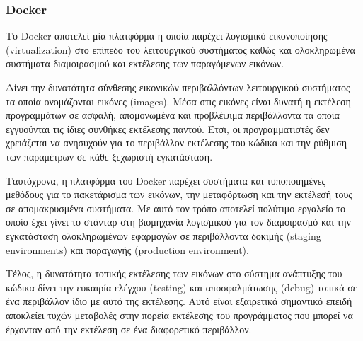 \subsubsection{Docker} \label{subsection:4-2-1-2-docker}


Το Docker αποτελεί μία πλατφόρμα η οποία παρέχει λογισμικό εικονοποίησης (virtualization) στο επίπεδο του λειτουργικού συστήματος καθώς και ολοκληρωμένα συστήματα διαμοιρασμού και εκτέλεσης των παραγόμενων εικόνων.

Δίνει την δυνατότητα σύνθεσης εικονικών περιβαλλόντων λειτουργικού συστήματος τα οποία ονομάζονται εικόνες (images). Μέσα στις εικόνες είναι δυνατή η εκτέλεση προγραμμάτων σε ασφαλή, απομονωμένα και προβλέψιμα περιβάλλοντα τα οποία εγγυούνται τις ίδιες συνθήκες εκτέλεσης παντού. Έτσι, οι προγραμματιστές δεν χρειάζεται να ανησυχούν για το περιβάλλον εκτέλεσης του κώδικα και την ρύθμιση των παραμέτρων σε κάθε ξεχωριστή εγκατάσταση.

Ταυτόχρονα, η πλατφόρμα του Docker παρέχει συστήματα και τυποποιημένες μεθόδους για το πακετάρισμα των εικόνων, την μεταφόρτωση και την εκτέλεσή τους σε απομακρυσμένα συστήματα. Με αυτό τον τρόπο αποτελεί πολύτιμο εργαλείο το οποίο έχει γίνει το στάνταρ στη βιομηχανία λογισμικού για τον διαμοιρασμό και την εγκατάσταση ολοκληρωμένων εφαρμογών σε περιβάλλοντα δοκιμής (staging environments) και παραγωγής (production environment).

Τέλος, η δυνατότητα τοπικής εκτέλεσης των εικόνων στο σύστημα ανάπτυξης του κώδικα δίνει την ευκαιρία ελέγχου (testing) και αποσφαλμάτωσης (debug) τοπικά σε ένα περιβάλλον ίδιο με αυτό της εκτέλεσης. Αυτό είναι εξαιρετικά σημαντικό επειδή αποκλείει τυχών μεταβολές στην πορεία εκτέλεσης του προγράμματος που μπορεί να έρχονταν από την εκτέλεση σε ένα διαφορετικό περιβάλλον.

